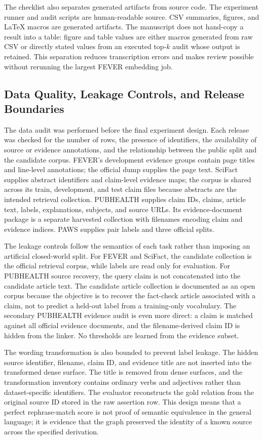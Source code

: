 \documentclass{ieeeaccess}
\begin{document}
The checklist also separates generated artifacts from source code. The experiment runner and audit scripts are human-readable source. CSV summaries, figures, and LaTeX macros are generated artifacts. The manuscript does not hand-copy a result into a table: figure and table values are either macros generated from raw CSV or directly stated values from an executed top-$k$ audit whose output is retained. This separation reduces transcription errors and makes review possible without rerunning the largest FEVER embedding job.

\subsection{Data Quality, Leakage Controls, and Release Boundaries}
The data audit was performed before the final experiment design. Each release was checked for the number of rows, the presence of identifiers, the availability of source or evidence annotations, and the relationship between the public split and the candidate corpus. FEVER's development evidence groups contain page titles and line-level annotations; the official dump supplies the page text. SciFact supplies abstract identifiers and claim-level evidence maps; the corpus is shared across its train, development, and test claim files because abstracts are the intended retrieval collection. PUBHEALTH supplies claim IDs, claims, article text, labels, explanations, subjects, and source URLs. Its evidence-document package is a separate harvested collection with filenames encoding claim and evidence indices. PAWS supplies pair labels and three official splits.

The leakage controls follow the semantics of each task rather than imposing an artificial closed-world split. For FEVER and SciFact, the candidate collection is the official retrieval corpus, while labels are read only for evaluation. For PUBHEALTH source recovery, the query claim is not concatenated into the candidate article text. The candidate article collection is documented as an open corpus because the objective is to recover the fact-check article associated with a claim, not to predict a held-out label from a training-only vocabulary. The secondary PUBHEALTH evidence audit is even more direct: a claim is matched against all official evidence documents, and the filename-derived claim ID is hidden from the linker. No thresholds are learned from the evidence subset.

The wording transformation is also bounded to prevent label leakage. The hidden source identifier, filename, claim ID, and evidence title are not inserted into the transformed dense surface. The title is removed from dense surfaces, and the transformation inventory contains ordinary verbs and adjectives rather than dataset-specific identifiers. The evaluator reconstructs the gold relation from the original source ID stored in the raw assertion row. This design means that a perfect rephrase-match score is not proof of semantic equivalence in the general language; it is evidence that the graph preserved the identity of a known source across the specified derivation.
\end{document}
